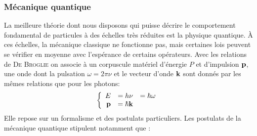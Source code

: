 \documentclass[svgnames,dvipsnames,a4paper,10pt,french]{report}
\begin{document}
\subsubsection{Mécanique quantique}
La meilleure théorie dont nous disposons qui puisse décrire le comportement fondamental de particules à des échelles très réduites est la physique quantique. À ces échelles, la mécanique classique ne fonctionne pas, mais certaines lois peuvent se vérifier en moyenne avec l'espérance de certains opérateurs. Avec les relations de \textsc{De Broglie} on associe à un corpuscule matériel d’énergie $P$ et d’impulsion $\mathbf{p}$, une onde dont la pulsation $\omega = 2 \pi\nu$ et le vecteur d’onde $\mathbf{k}$ sont donnés par les mêmes relations que pour les photons:
\begin{equation}
        \left\{\begin{array}{rcl}
        E &= h \nu &= \hbar \omega \\
        \mathbf{p} &= \hbar \mathbf{k} &
    \end{array}\right.
\end{equation}
Elle repose sur un formalisme et des postulats particuliers. Les postulats de la mécanique quantique stipulent notamment que :
\end{document}
